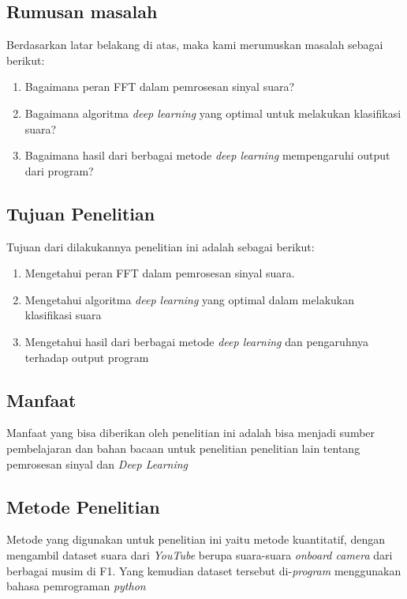 \subsection{Rumusan masalah}

Berdasarkan latar belakang di atas, maka kami merumuskan masalah sebagai berikut:

\begin{enumerate}
    \item Bagaimana peran FFT dalam pemrosesan sinyal suara?
    \item Bagaimana algoritma \textit{deep learning} yang optimal untuk melakukan klasifikasi suara?
    \item Bagaimana hasil dari berbagai metode \textit{deep learning} mempengaruhi output dari program?
\end{enumerate}

\subsection{Tujuan Penelitian}

Tujuan dari dilakukannya penelitian ini adalah sebagai berikut:

\begin{enumerate}
    \item Mengetahui peran FFT dalam pemrosesan sinyal suara.
    \item Mengetahui algoritma \textit{deep learning} yang optimal dalam melakukan klasifikasi suara
    \item Mengetahui hasil dari berbagai metode \textit{deep learning} dan pengaruhnya terhadap output program
\end{enumerate}

\subsection{Manfaat}

Manfaat yang bisa diberikan oleh penelitian ini adalah bisa menjadi sumber pembelajaran dan bahan bacaan untuk penelitian penelitian lain tentang pemrosesan sinyal dan \textit{Deep Learning} 

\subsection{Metode Penelitian}

Metode yang digunakan untuk penelitian ini yaitu metode kuantitatif, dengan mengambil dataset suara dari \textit{YouTube} berupa suara-suara \textit{onboard camera} dari berbagai musim di F1. Yang kemudian dataset tersebut di-\textit{program} menggunakan bahasa pemrograman \textit{python}

\newpage